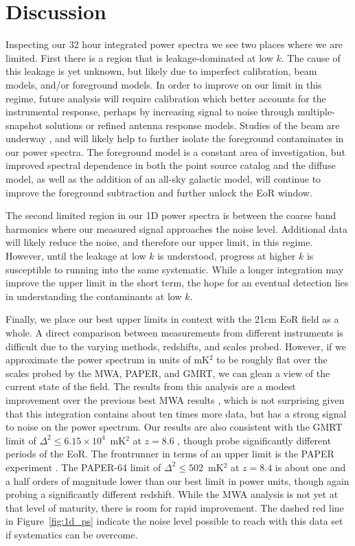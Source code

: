 \documentclass[iop]{emulateapj}
\begin{document}
\section{Discussion}\label{sec:discussion}
Inspecting our 32 hour integrated power spectra we see two places where we are limited. 
First there is a region that is leakage-dominated at low $k$. The cause of this leakage is yet 
unknown, but likely due to imperfect calibration, beam models, and/or foreground models. 
In order to improve on our limit in this regime, future analysis will require calibration which 
better accounts for the instrumental response, perhaps by increasing signal to noise 
through multiple-snapshot solutions or refined antenna response models. Studies of the 
beam are underway \citep[e.g.][]{Neben:2015}, and will likely help to further isolate the 
foreground contaminates in our power spectra. The foreground model is a constant area of 
investigation, but improved spectral dependence in both the point source catalog and the 
diffuse model, as well as the addition of an all-sky galactic model, will continue to improve 
the foreground subtraction and further unlock the EoR window.

The second limited region in our 1D power spectra is between the coarse band harmonics 
where our measured signal approaches the noise level. Additional data will likely reduce the 
noise, and therefore our upper limit, in this regime. However, until the leakage at low $k$ is 
understood, progress at higher $k$ is susceptible to running into the same systematic. 
While a longer integration may improve the upper limit in the short term, the hope for an 
eventual detection lies in understanding the contaminants at low $k$. 

Finally, we place our best upper limits in context with the 21cm EoR field as a whole. A 
direct comparison between measurements from different instruments is difficult due to the 
varying methods, redshifts, and scales probed. However, if we approximate the power 
spectrum in units of mK$^2$ to be roughly flat over the scales probed by the MWA, PAPER, 
and GMRT, we can glean a view of the current state of the field. The results from this 
analysis are a modest improvement over the previous best MWA results \citep{Dillon:2015}, 
which is not surprising given that this integration contains about ten times more data, but 
has a strong signal to noise on the power spectrum. Our results are also consistent with the 
GMRT limit of $\Delta^2\le6.15\times10^4$~mK$^2$ at $z=8.6$ \citep{Paciga:2013}, though 
probe significantly different periods of the EoR. The frontrunner in terms of an upper limit is 
the PAPER experiment \citep{Ali:2015, Jacobs:2015, Parsons:2014}. The PAPER-64 limit of 
$\Delta^2\le502$~mK$^2$ at $z=8.4$ is about one and a half orders of magnitude lower 
than our best limit in power units, though again probing a significantly different redshift. 
While the MWA analysis is not yet at that level of maturity, there is room for rapid 
improvement. The dashed red line in Figure~\ref{fig:1d_ps} indicate the noise level possible 
to reach with this data set if systematics can be overcome.
\end{document}
